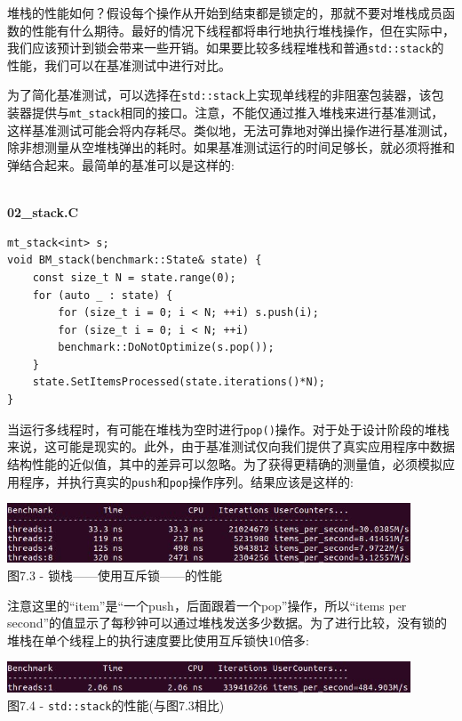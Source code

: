 堆栈的性能如何？假设每个操作从开始到结束都是锁定的，那就不要对堆栈成员函数的性能有什么期待。最好的情况下线程都将串行地执行堆栈操作，但在实际中，我们应该预计到锁会带来一些开销。如果要比较多线程堆栈和普通\texttt{std::stack}的性能，我们可以在基准测试中进行对比。

为了简化基准测试，可以选择在\texttt{std::stack}上实现单线程的非阻塞包装器，该包装器提供与\texttt{mt\_stack}相同的接口。注意，不能仅通过推入堆栈来进行基准测试，这样基准测试可能会将内存耗尽。类似地，无法可靠地对弹出操作进行基准测试，除非想测量从空堆栈弹出的耗时。如果基准测试运行的时间足够长，就必须将推和弹结合起来。最简单的基准可以是这样的:

\hspace*{\fill} \\ %
\noindent
\textbf{02\_stack.C}
\begin{lstlisting}[style=styleCXX]
mt_stack<int> s;
void BM_stack(benchmark::State& state) {
	const size_t N = state.range(0);
	for (auto _ : state) {
		for (size_t i = 0; i < N; ++i) s.push(i);
		for (size_t i = 0; i < N; ++i)
		benchmark::DoNotOptimize(s.pop());
	}
	state.SetItemsProcessed(state.iterations()*N);
}
\end{lstlisting}

当运行多线程时，有可能在堆栈为空时进行\texttt{pop()}操作。对于处于设计阶段的堆栈来说，这可能是现实的。此外，由于基准测试仅向我们提供了真实应用程序中数据结构性能的近似值，其中的差异可以忽略。为了获得更精确的测量值，必须模拟应用程序，并执行真实的\texttt{push}和\texttt{pop}操作序列。结果应该是这样的:

\begin{center}
\includegraphics[width=0.9\textwidth]{content/2/chapter7/images/3.jpg}\\
图7.3 - 锁栈——使用互斥锁——的性能
\end{center}

注意这里的“item”是“一个push，后面跟着一个pop”操作，所以“items per second”的值显示了每秒钟可以通过堆栈发送多少数据。为了进行比较，没有锁的堆栈在单个线程上的执行速度要比使用互斥锁快10倍多:

\begin{center}
\includegraphics[width=0.9\textwidth]{content/2/chapter7/images/4.jpg}\\
图7.4 - \texttt{std::stack}的性能(与图7.3相比)
\end{center}


